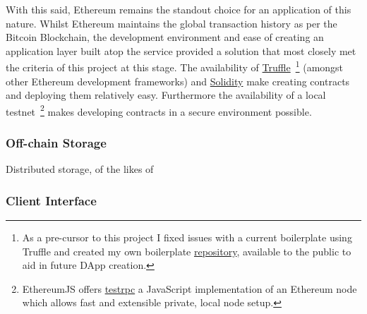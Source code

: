 With this said, Ethereum remains the standout choice for an application of this nature. Whilst Ethereum maintains the global transaction history as per the Bitcoin Blockchain, the development environment and ease of creating an application layer built atop the service provided a solution that most closely met the criteria of this project at this stage. The availability of \href{https://github.com/trufflesuite/truffle}{Truffle}~\footnote{As a pre-cursor to this project I fixed issues with a current boilerplate using Truffle and created my own boilerplate \href{https://github.com/FreddieLindsey/truffle-webpack-boilerplate}{repository}, available to the public to aid in future DApp creation.} (amongst other Ethereum development frameworks) and \href{https://github.com/ethereum/solidity}{Solidity} make creating contracts and deploying them relatively easy. Furthermore the availability of a local testnet~\footnote{EthereumJS offers \href{https://github.com/ethereumjs/testrpc}{testrpc} a JavaScript implementation of an Ethereum node which allows fast and extensible private, local node setup.} makes developing contracts in a secure environment possible.

\subsubsection{Off-chain Storage}

Distributed storage, of the likes of 

\subsubsection{Client Interface}


